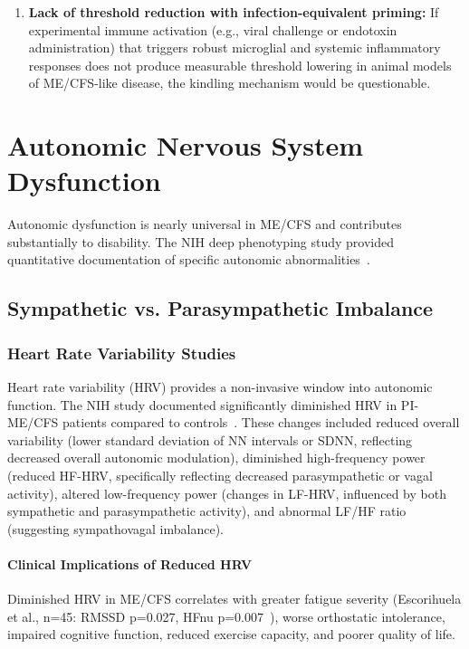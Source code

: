 \begin{hypothesis}
\begin{enumerate}
    \item \textbf{Lack of threshold reduction with infection-equivalent priming:} If experimental immune activation (e.g., viral challenge or endotoxin administration) that triggers robust microglial and systemic inflammatory responses does not produce measurable threshold lowering in animal models of ME/CFS-like disease, the kindling mechanism would be questionable.
\end{enumerate}

\end{hypothesis}

\section{Autonomic Nervous System Dysfunction}
\label{sec:ans-pathophysiology}

Autonomic dysfunction is nearly universal in ME/CFS and contributes substantially to disability. The NIH deep phenotyping study provided quantitative documentation of specific autonomic abnormalities~\cite{walitt2024deep}.

\subsection{Sympathetic vs. Parasympathetic Imbalance}
\label{sec:autonomic-imbalance}

\subsubsection{Heart Rate Variability Studies}

Heart rate variability (HRV) provides a non-invasive window into autonomic function. The NIH study documented significantly diminished HRV in PI-ME/CFS patients compared to controls~\cite{walitt2024deep}. These changes included reduced overall variability (lower standard deviation of NN intervals or SDNN, reflecting decreased overall autonomic modulation), diminished high-frequency power (reduced HF-HRV, specifically reflecting decreased parasympathetic or vagal activity), altered low-frequency power (changes in LF-HRV, influenced by both sympathetic and parasympathetic activity), and abnormal LF/HF ratio (suggesting sympathovagal imbalance).

\paragraph{Clinical Implications of Reduced HRV}
Diminished HRV in ME/CFS correlates with greater fatigue severity (Escorihuela et al., n=45: RMSSD p=0.027, HFnu p=0.007~\cite{Escorihuela2020hrv}), worse orthostatic intolerance, impaired cognitive function, reduced exercise capacity, and poorer quality of life.

